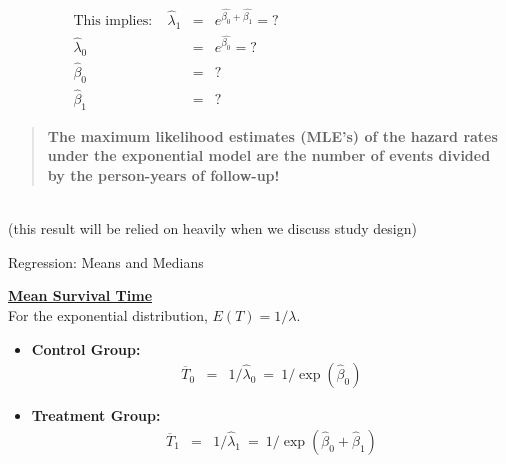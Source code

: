 \documentclass[envcountsect, 10pt, portrait, palatino]{beamer}
\begin{document}
\begin{frame}
\begin{eqnarray*}
\mbox{This implies:}~~~~~ \hat\lambda_1 & =
& e^{\hat{\beta_0} + \hat{\beta_1}} = ? \hspace{2in} \\[1.5ex]
\hat\lambda_0 & = & e^{\hat{\beta_0}} = ?\\[1.5ex]
\hat\beta_0 & = & ?\\[1.5ex]
\hat\beta_1 & = & ?
\end{eqnarray*}
\begin{quote}
{\bf The maximum likelihood estimates (MLE's) of the hazard rates
under the exponential model are the number of events divided by
the person-years of follow-up!}
\end{quote}
\\[2ex]
(this result will be relied on heavily when we discuss study design)
\end{frame}
\begin{frame}{Regression: Means and Medians}

\underline{\bf Mean Survival Time}
~\\[1ex]
For the exponential distribution, $E(T)=1/\lambda$.
\begin{itemize}
\item {\bf Control Group:}
\begin{eqnarray*}
\overline{T}_0 & = & 1/\hat\lambda_0 ~=~ 1/\exp(\hat\beta_0)
\end{eqnarray*}

\item {\bf Treatment Group:}
\begin{eqnarray*}
\overline{T}_1 & = & 1/\hat\lambda_1 ~=~ 1/\exp(\hat\beta_0 + \hat\beta_1)
\end{eqnarray*}
\end{itemize}
\end{frame} 
\end{document}
